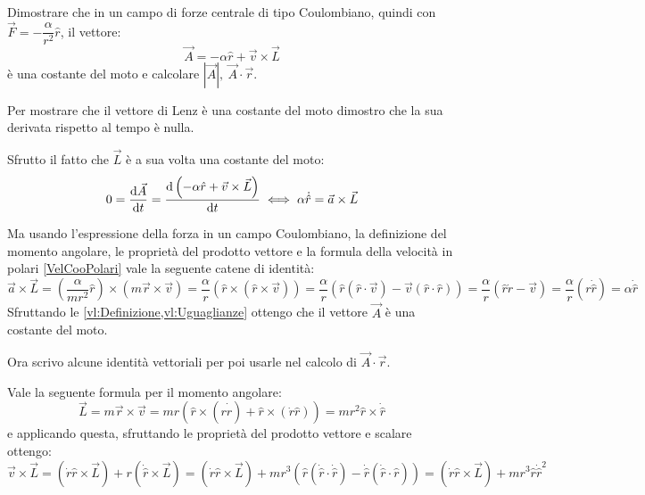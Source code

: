 \documentclass[../main.tex]{subfiles}
\begin{document}

\textex
Dimostrare che in un campo di forze centrale di tipo Coulombiano, quindi con $\vec{F}=-\dfrac{\alpha}{r^2}\hat r$, il vettore:
\begin{equation} \label{vl:Definizione}
	\vec{A}=-\alpha \hat r + \vec v\times \vec L
\end{equation}
è una costante del moto e calcolare $|\vec A|,\ \vec{A} \cdot \vec{r}$.


\solution
Per mostrare che il vettore di Lenz è una costante del moto dimostro che la sua derivata rispetto al tempo è nulla.

Sfrutto il fatto che $\vec L$ è a sua volta una costante del moto:
\begin{equation}\label{vl:Derivata}
	0=\frac{\mathrm{d} \vec A}{\mathrm{d} t}=\frac{\mathrm{d} \left(-\alpha\hat r + \vec v\times \vec L\right) }{\mathrm{d} t} \iff \alpha\dot{\hat r} = \vec a\times \vec L
\end{equation}

Ma usando l'espressione della forza in un campo Coulombiano, la definizione del momento angolare, le proprietà del prodotto vettore 
e la formula della velocità in polari \cref{VelCooPolari} vale la seguente catene di identità:
\begin{equation}\label{vl:Uguaglianze}
	\vec a\times \vec L=\left(\dfrac{\alpha}{mr^2}\hat r \right)\times\left(m\vec r\times \vec v\right)=\frac{\alpha}{r} \left(\hat r\times \left(\hat r\times \vec v\right)\right)
        =\frac{\alpha}{r} \left(\hat r\left(\hat r \cdot \vec v\right)-\vec v\left(\hat r\cdot \hat r\right)\right)
	=\frac{\alpha}{r} \left(\hat r\dot{r}-\vec v\right)=\frac{\alpha}{r}\left(r\dot{\hat r}\right)=\alpha \dot{\hat r}
\end{equation}
Sfruttando le \cref{vl:Definizione,vl:Uguaglianze} ottengo che il vettore $\vec A$ è una costante del moto.

Ora scrivo alcune identità vettoriali per poi usarle nel calcolo di $\vec A\cdot \vec r$.

Vale la seguente formula per il momento angolare:
\begin{equation*}
	\vec L=m\vec r\times \vec v=mr\left(\hat r\times (r\dot{ \hat r })+\hat r\times(\dot r \hat r)\right)
	= mr^2\hat r\times\dot{\hat r}
\end{equation*}
e applicando questa, sfruttando le proprietà del prodotto vettore e scalare ottengo:
\begin{equation}\label{vl:VperL}
	\vec v\times \vec L=(\dot r \hat r \times \vec L)+r\left(\dot{\hat r}\times \vec L\right)
	=(\dot r \hat r \times \vec L)+mr^3\left(\hat r(\dot{\hat r}\cdot \dot{\hat r})-\dot{\hat r}(\dot{\hat r}\cdot \hat r) \right)
	=(\dot r \hat r \times \vec L)+mr^3 \hat r \dot{\hat r}^2
\end{equation}
\end{document}
